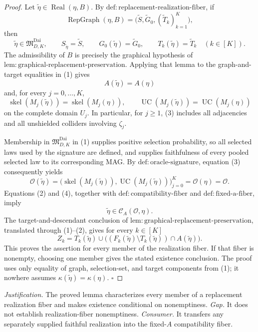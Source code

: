 \documentclass{article}
\begin{document}
\begin{proof}
Let \(\widetilde\eta\in\operatorname{Real}(\eta,B)\).  By \(\mathrm{def:replacement\mbox{-}realization\mbox{-}fiber}\), if
\[
 \operatorname{RepGraph}(\eta,B)
 =\bigl(\widetilde S,\widetilde G_0,(\widetilde T_k)_{k=1}^K\bigr),
\]
then
\[
 \widetilde\eta\in\mathfrak M_{D,K}^{\mathrm{Dai}},\qquad
 S_{\widetilde\eta}=\widetilde S,\qquad
 G_0(\widetilde\eta)=\widetilde G_0,
 \qquad
 T_k(\widetilde\eta)=\widetilde T_k\quad(k\in[K]).
 \tag{1}
\]
The admissibility of \(B\) is precisely the graphical hypothesis of \(\mathrm{lem:graphical\mbox{-}replacement\mbox{-}preservation}\).  Applying that lemma to the graph-and-target equalities in (1) gives
\[
 A(\widetilde\eta)=A(\eta)
 \tag{2}
\]
and, for every \(j=0,\ldots,K\),
\[
 \operatorname{skel}(M_j(\widetilde\eta))
 =\operatorname{skel}(M_j(\eta)),
 \qquad
 \operatorname{UC}(M_j(\widetilde\eta))
 =\operatorname{UC}(M_j(\eta))
 \tag{3}
\]
on the complete domain \(U_j\).  In particular, for \(j\geq1\), (3) includes all adjacencies and all unshielded colliders involving \(\zeta_j\).

Membership in \(\mathfrak M_{D,K}^{\mathrm{Dai}}\) in (1) supplies positive selection probability, so all selected laws used by the signature are defined, and supplies faithfulness of every pooled selected law to its corresponding MAG.  By \(\mathrm{def:oracle\mbox{-}signature}\), equation (3) consequently yields
\[
 \mathcal O(\widetilde\eta)
 =\bigl(\operatorname{skel}(M_j(\widetilde\eta)),
         \operatorname{UC}(M_j(\widetilde\eta))\bigr)_{j=0}^K
 =\mathcal O(\eta)=\mathcal O.
 \tag{4}
\]
Equations (2) and (4), together with \(\mathrm{def:compatibility\mbox{-}fiber}\) and \(\mathrm{def:fixed\mbox{-}a\mbox{-}fiber}\), imply
\[
 \widetilde\eta\in\mathcal C_A(\mathcal O,\eta).
 \tag{5}
\]
The target-and-descendant conclusion of \(\mathrm{lem:graphical\mbox{-}replacement\mbox{-}preservation}\), translated through (1)--(2), gives for every \(k\in[K]\)
\[
 Z_k=T_k(\widetilde\eta)\cup
 \bigl((F_k(\widetilde\eta)\setminus T_k(\widetilde\eta))
       \cap A(\widetilde\eta)\bigr).
 \tag{6}
\]
This proves the assertion for every member of the realization fiber.  If that fiber is nonempty, choosing one member gives the stated existence conclusion.  The proof uses only equality of graph, selection-set, and target components from (1); it nowhere assumes \(\kappa(\widetilde\eta)=\kappa(\eta)\).  \(\square\)
\end{proof}
\par\smallskip\noindent \textit{Justification.} The proved lemma characterizes every member of a replacement realization fiber and makes existence conditional on nonemptiness. \textit{Gap.} It does not establish realization-fiber nonemptiness. \textit{Consumer.} It transfers any separately supplied faithful realization into the fixed-\(A\) compatibility fiber.
\end{document}
